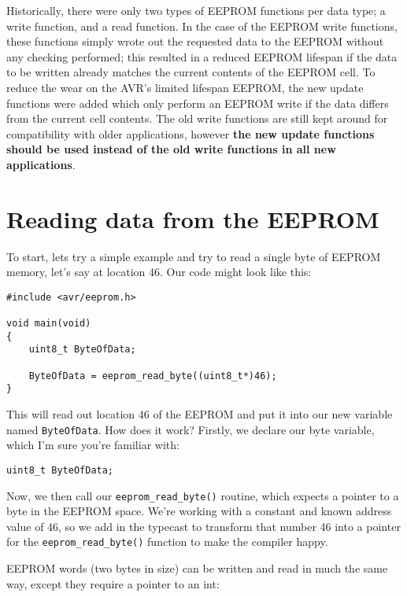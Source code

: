 \documentclass[a4paper,oneside,notitlepage]{book}
\begin{document}
Historically, there were only two types of EEPROM functions per data type; a write function, and a read function. In the case of the EEPROM write functions, these functions simply wrote out the requested data to the EEPROM without any checking performed; this resulted in a reduced EEPROM lifespan if the data to be written already matches the current contents of the EEPROM cell. To reduce the wear on the AVR's limited lifespan EEPROM, the new update functions were added which only perform an EEPROM write if the data differs from the current cell contents. The old write functions are still kept around for compatibility with older applications, however \textbf{the new update functions should be used instead of the old write functions in all new applications}.


\chapter{Reading data from the EEPROM}

To start, lets try a simple example and try to read a single byte of EEPROM memory, let's say at location 46. Our code might look like this:

\begin{center}
\begin{lstlisting}
#include <avr/eeprom.h>

void main(void)
{
    uint8_t ByteOfData;

    ByteOfData = eeprom_read_byte((uint8_t*)46);
}
\end{lstlisting}
\end{center}

This will read out location 46 of the EEPROM and put it into our new variable named \lstinline{ByteOfData}. How does it work? Firstly, we declare our byte variable, which I'm sure you're familiar with:

\begin{center}
\begin{lstlisting}
uint8_t ByteOfData;
\end{lstlisting}
\end{center}

Now, we then call our \lstinline{eeprom_read_byte()} routine, which expects a pointer to a byte in the EEPROM space. We're working with a constant and known address value of 46, so we add in the typecast to transform that number 46 into a pointer for the \lstinline{eeprom_read_byte()} function to make the compiler happy.

EEPROM words (two bytes in size) can be written and read in much the same way, except they require a pointer to an int:
\end{document}
